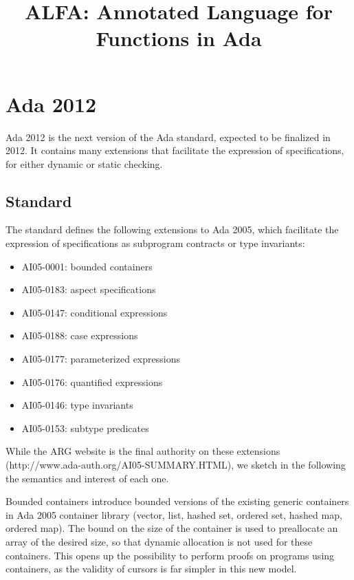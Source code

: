 \documentclass{article}
\title{ALFA: Annotated Language for Functions in Ada}
\begin{document}
\maketitle
\sloppy
\section{Ada 2012}

Ada 2012 is the next version of the Ada standard, expected to be finalized in
2012. It contains many extensions that facilitate the expression of
specifications, for either dynamic or static checking.

\subsection{Standard}

The standard defines the following extensions to Ada 2005, which facilitate the
expression of specifications as subprogram contracts or type invariants:

\begin{itemize}
\item AI05-0001: bounded containers
\item AI05-0183: aspect specifications
\item AI05-0147: conditional expressions
\item AI05-0188: case expressions
\item AI05-0177: parameterized expressions
\item AI05-0176: quantified expressions
\item AI05-0146: type invariants
\item AI05-0153: subtype predicates
\end{itemize}

While the ARG website is the final authority on these extensions
(http://www.ada-auth.org/AI05-SUMMARY.HTML), we sketch in the following the
semantics and interest of each one.

Bounded containers introduce bounded versions of the existing generic
containers in Ada 2005 container library (vector, list, hashed set, ordered
set, hashed map, ordered map). The bound on the size of the container is used
to preallocate an array of the desired size, so that dynamic allocation is not
used for these containers. This opens up the possibility to perform proofs on
programs using containers, as the validity of cursors is far simpler in this
new model.
\end{document}

